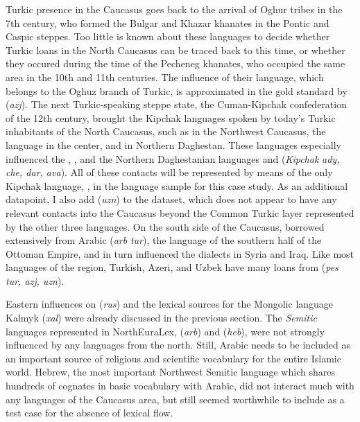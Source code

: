 Turkic presence in the Caucasus goes back to the arrival of Oghur tribes in the 7th century, who formed the Bulgar and Khazar khanates in the Pontic and Caspic steppes. Too little is known about these languages to decide whether Turkic loans in the North Caucasus can be traced back to this time, or whether they occured during the time of the Pecheneg khanates, who occupied the same area in the 10th and 11th centuries. The influence of their  language, which belongs to the Oghuz branch of Turkic, is approximated in the gold standard by  (\textit{azj}). The next Turkic-speaking steppe state, the Cuman-Kipchak confederation of the 12th century, brought the Kipchak languages spoken by today's Turkic inhabitants of the North Caucasus, such as  in the Northwest Caucasus, the  language in the center, and  in Northern Daghestan. These languages especially influenced the , , and the Northern Daghestanian languages  and  (\textit{Kipchak} \arrowLA \textit{ady, che, dar, ava}). All of these contacts will be represented by means of the only Kipchak language, , in the language sample for this case study. As an additional datapoint, I also add  (\textit{uzn}) to the dataset, which does not appear to have any relevant contacts into the Caucasus beyond the Common Turkic layer represented by the other three languages. On the south side of the Caucasus,  borrowed extensively from Arabic (\textit{arb} \arrowLA \textit{tur}), the language of the southern half of the Ottoman Empire, and in turn influenced the  dialects in Syria and Iraq. Like most languages of the region, Turkish, Azeri, and Uzbek have many loans from  (\textit{pes} \arrowLA \textit{tur, azj, uzn}).

Eastern influences on  (\textit{rus}) and the lexical sources for the Mongolic language Kalmyk (\textit{xal}) were already discussed in the previous section. The \textit{Semitic} languages represented in NorthEuraLex,  (\textit{arb}) and  (\textit{heb}), were not strongly influenced by any languages from the north. Still, Arabic needs to be included as an important source of religious and scientific vocabulary for the entire Islamic world. Hebrew, the most important Northwest Semitic language which shares hundreds of cognates in basic vocabulary with Arabic, did not interact much with any languages of the Caucasus area, but still seemed worthwhile to include as a test case for the absence of lexical flow.

